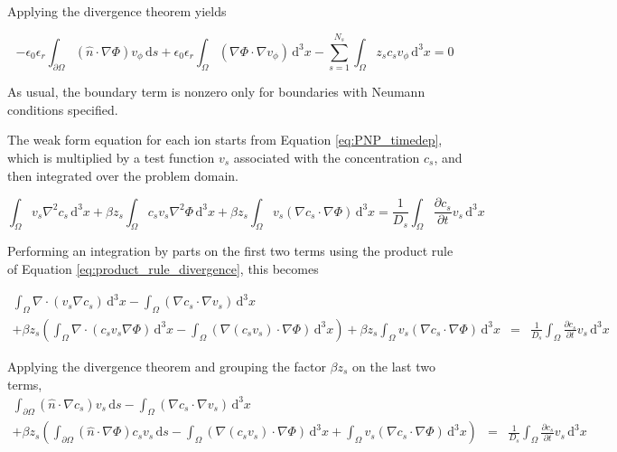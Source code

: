 Applying the divergence theorem yields

\begin{equation}
  \boxed{
    -\epsilon_{0}\epsilon_{r} \int_{\partial\Omega} \left( \hat{n} \cdot \nabla \Phi \right) v_\phi \,\mathrm{d}s
    + \epsilon_{0}\epsilon_{r} \int_\Omega  \left( \nabla \Phi \cdot \nabla v_\phi \right) \,\mathrm{d}^3x
    - \sum_{s=1}^{N_s} \int_\Omega z_s c_s v_\phi \,\mathrm{d}^3x = 0
  }
\end{equation}

As usual, the boundary term is nonzero only for boundaries with Neumann conditions specified.

The weak form equation for each ion starts from Equation \ref{eq:PNP_timedep},
which is multiplied by a test function $v_s$ associated with the concentration $c_s$,
and then integrated over the problem domain.

\begin{equation}
  \int_\Omega v_s \nabla^2 c_s \,\mathrm{d}^3x 
  + \beta z_s \int_\Omega c_s v_s \nabla^2 \Phi \,\mathrm{d}^3x
  + \beta z_s \int_\Omega  v_s \left( \nabla c_s \cdot \nabla \Phi \right) \,\mathrm{d}^3x
  = \frac{1}{D_s} \int_\Omega \frac{\partial c_s}{\partial t} v_s \,\mathrm{d}^3x
\end{equation}

Performing an integration by parts on the first two terms
using the product rule of Equation \ref{eq:product_rule_divergence}, this becomes

\begin{equation}
  \begin{aligned}
    \int_\Omega \nabla \cdot \left( v_s \nabla c_s \right) \,\mathrm{d}^3x
    - \int_\Omega \left( \nabla c_s \cdot \nabla v_s \right) \,\mathrm{d}^3x \\
    + \beta z_s \left( \int_\Omega \nabla \cdot \left( c_s v_s \nabla \Phi \right) \,\mathrm{d}^3x
    - \int_\Omega \left( \nabla \left( c_s v_s \right)  \cdot \nabla \Phi \right) \,\mathrm{d}^3x \right) 
    + \beta z_s \int_\Omega  v_s \left( \nabla c_s \cdot \nabla \Phi \right) \,\mathrm{d}^3x
    & = & \frac{1}{D_s} \int_\Omega \frac{\partial c_s}{\partial t} v_s \,\mathrm{d}^3x
  \end{aligned}
\end{equation}

Applying the divergence theorem and grouping the factor $\beta z_s$ on the last two terms,
\begin{equation}
  \begin{aligned}
    \int_{\partial\Omega} \left( \hat{n} \cdot \nabla c_s \right) v_s \,\mathrm{d}s
    - \int_\Omega \left( \nabla c_s \cdot \nabla v_s \right) \,\mathrm{d}^3x \\
    + \beta z_s \left( \int_{\partial\Omega} \left( \hat{n} \cdot \nabla \Phi \right) c_s v_s \,\mathrm{d}s
    - \int_\Omega \left( \nabla \left( c_s v_s \right)  \cdot \nabla \Phi \right) \,\mathrm{d}^3x
    + \int_\Omega  v_s \left( \nabla c_s \cdot \nabla \Phi \right) \,\mathrm{d}^3x \right) 
    & = & \frac{1}{D_s} \int_\Omega \frac{\partial c_s}{\partial t} v_s \,\mathrm{d}^3x
  \end{aligned}
\end{equation}

